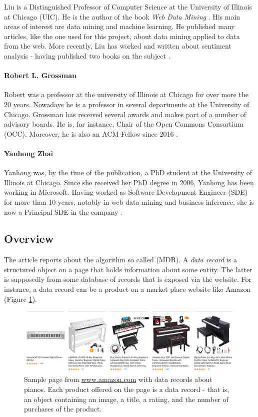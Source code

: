 \documentclass[10pt]{article}
\begin{document}
Liu is a Distinguished Professor of Computer Science at the University of Illinois at Chicago (UIC). He is the author of the book \emph{Web Data Mining} \citep{web-data-mining}. His main areas of interest are data mining and machine learning. He published many articles, like the one used for this project, about data mining applied to data from the web. More recently, Liu has worked and written about sentiment analysis - having published two books on the subject \citep{liu-page}.

\paragraph{Robert L. Grossman}

Robert was a professor at the university of Illinois at Chicago for over more the 20 years. Nowadays he is a professor in several departments at the University of Chicago. Grossman has received several awards and makes part of a number of advisory boards. He is, for instance, Chair of the Open Commons Consortium (OCC). Moreover, he is also an ACM Fellow since 2016 \citep{robert-page, robert-linkedin}.

\paragraph{Yanhong Zhai}

Yanhong was, by the time of the publication, a PhD student at the University of Illinois at Chicago. Since she received her PhD degree in 2006, Yanhong has been working in Microsoft. Having worked as Software Development Engineer (SDE) for more than 10 years, notably in web data mining and business inference, she is now a Principal SDE in the company \citep{yanhong-page, yanhong-linkedin}.

\subsection{Overview}

The article reports about the algorithm so called  (MDR). A \emph{data record} is a structured object on a page that holds information about some entity. The latter is supposedly from some database of records that is exposed via the website. For instance, a data record can be a product on a market place website like Amazon (Figure \ref{fig:pianos}).

\begin{figure}[b]
  \includegraphics[width=0.9\linewidth]{fig/pianos.png}
  \caption{Sample page from \href{www.amazon.com}{www.amazon.com} with data records about pianos. Each product offered on the page is a data record - that is, an object containing an image, a title, a rating, and the number of purchases of the product.}
  \label{fig:pianos}
\end{figure}
\end{document}
